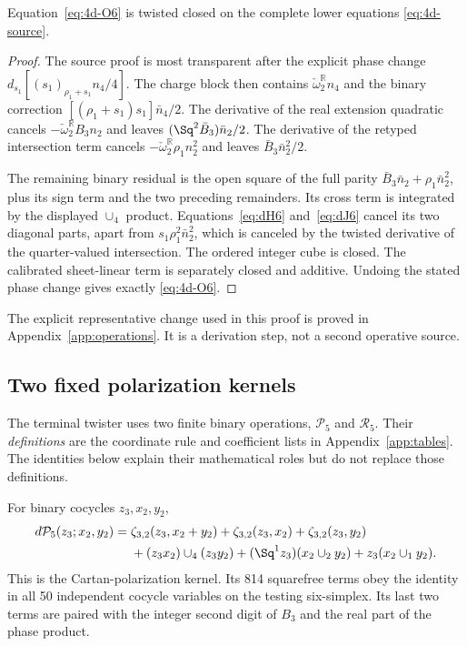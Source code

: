 \begin{theorem}\label{thm:parent}
Equation~\eqref{eq:4d-O6} is twisted closed on the complete lower equations \eqref{eq:4d-source}.
\end{theorem}
\begin{proof}
The source proof is most transparent after the explicit phase change
$d_{s_1}[(s_1)_{\rho_1+s_1}n_4/4]$. The charge block then contains
$\check\omega_2^{\mathbb R}n_4$
and the binary correction $[(\rho_1+s_1)s_1]\bar n_4/2$.
The derivative of the real extension quadratic cancels
$-\check\omega_2^{\mathbb R}B_3n_2$ and leaves
$(\Sq^2\bar B_3)\bar n_2/2$.
The derivative of the retyped intersection term cancels
$-\check\omega_2^{\mathbb R}\rho_1n_2^2$ and leaves
$\bar B_3\bar n_2^2/2$.

The remaining binary residual is the open square of the full parity
$\bar B_3\bar n_2+\rho_1\bar n_2^2$, plus its sign term and the two preceding remainders. Its cross term is integrated by the displayed $\cup_4$ product. Equations~\eqref{eq:dH6} and~\eqref{eq:dJ6} cancel its two diagonal parts, apart from $s_1\rho_1^2\bar n_2^2$, which is canceled by the twisted derivative of the quarter-valued intersection. The ordered integer cube is closed. The calibrated sheet-linear term is separately closed and additive. Undoing the stated phase change gives exactly \eqref{eq:4d-O6}.
\end{proof}
The explicit representative change used in this proof is proved in Appendix~\ref{app:operations}. It is a derivation step, not a second operative source.

\subsection{Two fixed polarization kernels}\label{subsec:kernels}
The terminal twister uses two finite binary operations, $\mathcal P_5$ and $\mathcal R_5$. Their \emph{definitions} are the coordinate rule and coefficient lists in Appendix~\ref{app:tables}. The identities below explain their mathematical roles but do not replace those definitions.

For binary cocycles $z_3,x_2,y_2$,
\begin{equation}\label{eq:P5identity}
 \begin{aligned}
 d\mathcal P_5(z_3;x_2,y_2)={}&
 \zeta_{3,2}(z_3,x_2+y_2)+\zeta_{3,2}(z_3,x_2)+\zeta_{3,2}(z_3,y_2)\\
 &+(z_3x_2)\cup_4(z_3y_2)
 +(\Sq^1z_3)(x_2\cup_2y_2)+z_3(x_2\cup_1y_2).
 \end{aligned}
\end{equation}
This is the Cartan-polarization kernel. Its 814 squarefree terms obey the identity in all 50 independent cocycle variables on the testing six-simplex. Its last two terms are paired with the integer second digit of $B_3$ and the real part of the phase product.

